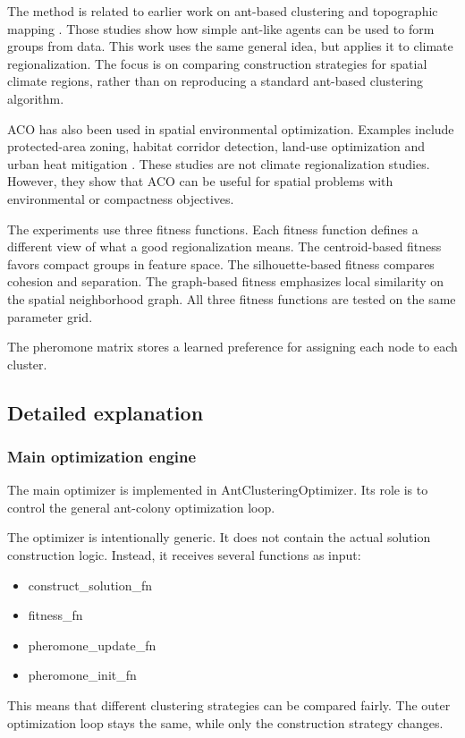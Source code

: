\documentclass[11pt]{article}
\begin{document}
The method is related to earlier work on ant-based clustering and topographic mapping \cite{deneubourg1991,handl2006}. Those studies show how simple ant-like agents can be used to form groups from data. This work uses the same general idea, but applies it to climate regionalization. The focus is on comparing construction strategies for spatial climate regions, rather than on reproducing a standard ant-based clustering algorithm.

ACO has also been used in spatial environmental optimization. Examples include protected-area zoning, habitat corridor detection, land-use optimization and urban heat mitigation \cite{liu2012,peng2019,zhang2021,tong2024}. These studies are not climate regionalization studies. However, they show that ACO can be useful for spatial problems with environmental or compactness objectives.

The experiments use three fitness functions. Each fitness function defines a different view of what a good regionalization means. The centroid-based fitness favors compact groups in feature space. The silhouette-based fitness compares cohesion and separation. The graph-based fitness emphasizes local similarity on the spatial neighborhood graph. All three fitness functions are tested on the same parameter grid.

The pheromone matrix stores a learned preference for assigning each node to each cluster.


\subsection{Detailed explanation}

\subsubsection{Main optimization engine}
The main optimizer is implemented in AntClusteringOptimizer. Its role is to control the general ant-colony optimization loop.

The optimizer is intentionally generic. It does not contain the actual solution construction logic. Instead, it receives several functions as input:
\begin{itemize}
  \item construct\_solution\_fn
  \item fitness\_fn
  \item pheromone\_update\_fn
  \item pheromone\_init\_fn
\end{itemize}
This means that different clustering strategies can be compared fairly. The outer optimization loop stays the same, while only the construction strategy changes.
\end{document}
